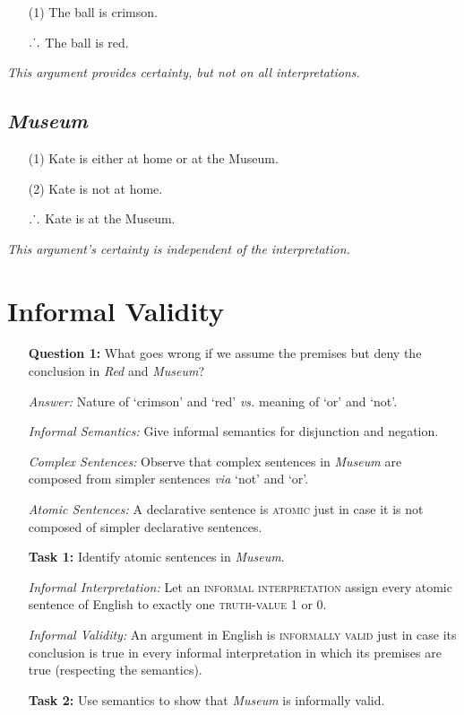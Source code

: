 \documentclass[a4paper, 11pt]{article} %
\def\therefore{\ensuremath{\ldotp\dot{}\,\ldotp}}
\begin{document}
\begin{enumerate}
  \item[(1)] The ball is crimson.
  \item[\therefore] The ball is red.
\end{enumerate}

\noindent
\textit{This argument provides certainty, but not on all interpretations.}

\subsection*{\it \textbf{Museum}}

\begin{enumerate}
  \item[(1)] Kate is either at home or at the Museum.
  \item[(2)] Kate is not at home.
  \item[\therefore] Kate is at the Museum.
\end{enumerate}

\noindent
\textit{This argument's certainty is independent of the interpretation.}


\section*{Informal Validity}

\begin{enumerate}[leftmargin=1.2in,labelsep=.15in] %
  \item[\bf Question 1:] What goes wrong if we assume the premises but deny the conclusion in \textit{Red} and \textit{Museum}?
  \item[\it Answer:] Nature of `crimson' and `red' \textit{vs.} meaning of `or' and `not'.
  \item[\it Informal Semantics:] Give informal semantics for disjunction and negation.
  \item[\it Complex Sentences:] Observe that complex sentences in \textit{Museum} are composed from simpler sentences \textit{via} `not' and `or'.
  \item[\it Atomic Sentences:] A declarative sentence is \textsc{atomic} just in case it is not composed of simpler declarative sentences.
  \item[\bf Task 1:] Identify atomic sentences in \textit{Museum}.
  \item[\it Informal Interpretation:] Let an \textsc{informal interpretation} assign every atomic sentence of English to exactly one \textsc{truth-value} 1 or 0.
  \item[\it Informal Validity:] An argument in English is \textsc{informally valid} just in case its conclusion is true in every informal interpretation in which its premises are true (respecting the semantics).
  \item[\bf Task 2:] Use semantics to show that \textit{Museum} is informally valid.
\end{enumerate}
\end{document}
